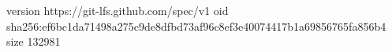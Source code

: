version https://git-lfs.github.com/spec/v1
oid sha256:ef6bc1da71498a275c9de8dfbd73af96c8ef3e40074417b1a69856765fa856b4
size 132981
